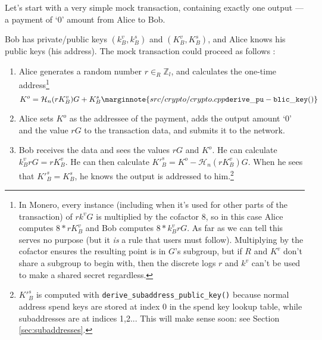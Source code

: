 
Let’s start with a very simple mock transaction, containing exactly one output --- a payment of `0' amount from Alice to Bob.

Bob has private/public keys $(k_B^v, k_B^s)$ and $(K_B^v, K_B^s)$, and Alice knows his public keys (his address). The mock transaction could proceed as follows \cite{cryptoNoteWhitePaper}:

\begin{enumerate}
	\item Alice generates a random number $r \in_R \mathbb{Z}_l$, and calculates the one-time address\footnote{In Monero, every instance (including when it's used for other parts of the transaction) of $r k^v G$ is multiplied by the cofactor 8, so in this case Alice computes $8*r K^v_B$ and Bob computes $8*k^v_B r G$. As far as we can tell this serves no purpose (but it {\em is} a rule that users must follow). Multiplying by the cofactor ensures the resulting point is in $G$'s subgroup, but if $R$ and $K^v$ don't share a subgroup to begin with, then the discrete logs $r$ and $k^v$ can't be used to make a shared secret regardless.}\vspace{.175cm}
	\[K^o  = \mathcal{H}_n(r K_B^v)G + K_B^s\marginnote{src/crypto/ crypto.cpp {\tt derive\_pu- blic\_key()}}\]

	\item Alice sets $K^o$ as the addressee of the payment, adds the output amount `0' and the value $r G$ to the transaction data, and submits it to the network.

	\item Bob receives the data and sees the values $r G$ and $K^o$. He can calculate $k_B^v r G = r K_B^v$. He can then calculate $K'^s_B = K^o - \mathcal{H}_n(r K_B^v)G$. When he sees that $K'^s_B = K_B^s$, he knows the output is addressed to him.\footnote{$K'^s_B $ is computed with {\tt derive\_subaddress\_public\_key()} because normal address spend keys are stored at index 0 in the spend key lookup table, while subaddresses are at indices 1,2... This will make sense soon: see Section \ref{sec:subaddresses}.}


\end{enumerate}

